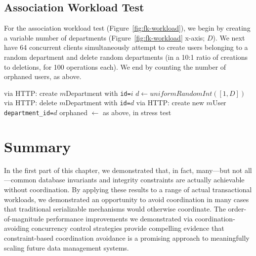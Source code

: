 \subsection{Association Workload Test}
\label{sec:appendix-association-workload}

For the association workload test (Figure~\ref{fig:fk-workload}), we begin by creating a variable number of departments (Figure~\ref{fig:fk-workload} x-axis; $D$). We next have 64 concurrent clients simultaneously attempt to create users belonging to a random department and delete random departments (in a 10:1 ratio of creations to deletions, for 100 operations each). We end by counting the number of orphaned users, as above. 
\begin{algorithm}[H]
\begin{algorithmic}
    \State via HTTP: create $m$Department with \texttt{id=$i$}
  \EndFor
      \State $d \gets uniformRandomInt([1, D])$
        \State via HTTP: delete $m$Department with \texttt{id=$d$}
      \Else
        \State via HTTP: create new $m$User \texttt{department\_id=$d$}
      \EndIf        
   \EndParFor
   \State orphaned $\gets $ as above, in stress test
\EndFor
\end{algorithmic}
\end{algorithm}

\section{Summary}

In the first part of this chapter, we demonstrated that, in fact,
many---but not all---common database invariants and integrity
constraints are actually achievable without coordination. By applying
these results to a range of actual transactional workloads, we
demonstrated an opportunity to avoid coordination in many cases that
traditional serializable mechanisms would otherwise coordinate. The
order-of-magnitude performance improvements we demonstrated via
coordination-avoiding concurrency control strategies provide
compelling evidence that constraint-based coordination avoidance is a
promising approach to meaningfully scaling future data management
systems.

